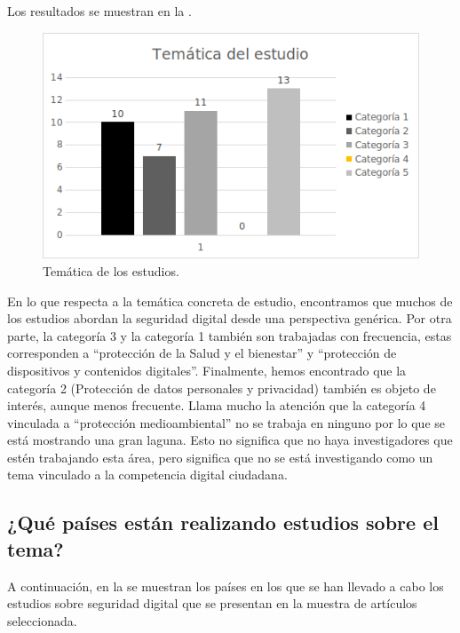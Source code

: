 \documentclass[spanish]{textolivre}
\begin{document}
Los resultados se muestran en la .

\begin{figure}[h!]
\centering
\begin{minipage}{0.75\textwidth}
\includegraphics[width=\textwidth]{Fig5.png}
\caption{Temática de los estudios.}
\label{fig5}
\end{minipage}
\end{figure}

En lo que respecta a la temática concreta de estudio, encontramos que muchos de los estudios abordan la seguridad digital desde una perspectiva genérica. Por otra parte, la categoría 3 y la categoría 1 también son trabajadas con frecuencia, estas corresponden a “protección de la Salud y el bienestar” y “protección de dispositivos y contenidos digitales”. Finalmente, hemos encontrado que la categoría 2 (Protección de datos personales y privacidad) también es objeto de interés, aunque menos frecuente. Llama mucho la atención que la categoría 4 vinculada a “protección medioambiental” no se trabaja en ninguno por lo que se está mostrando una gran laguna. Esto no significa que no haya investigadores que estén trabajando esta área, pero significa que no se está investigando como un tema vinculado a la competencia digital ciudadana.

\subsection{¿Qué países están realizando estudios sobre el tema?}\label{sec-organizacao}
A continuación, en la  se muestran los países en los que se han llevado a cabo los estudios sobre seguridad digital que se presentan en la muestra de artículos seleccionada.
\end{document}
